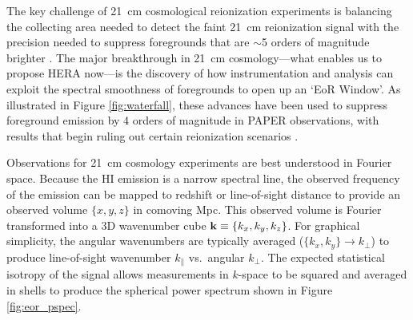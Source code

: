 \documentclass[preprint]{aastex}
\def\kperp{k_{\bot}}
\def\kpar{k_{\|}}
\def\kperp{k_{\bot}}
\def\kpar{k_{\|}}
\def\k{{\bf k}}
\def\HI{{H{\small I }}}
\begin{document}
The key challenge of 21~cm cosmological reionization experiments is 
balancing the collecting area needed to detect the faint 21~cm reionization signal
with the precision needed to suppress
foregrounds that are $\sim$5 orders of magnitude brighter \cite{deolivieracosta_et_al2008}.
The major breakthrough in 21~cm cosmology---what enables us to propose HERA now---is 
the discovery of how 
instrumentation and analysis can exploit the 
spectral smoothness of foregrounds
to open up an `EoR Window'.  
As illustrated in Figure \ref{fig:waterfall}, these advances have been used to suppress foreground emission by 4
orders of magnitude in PAPER observations,
with results that begin ruling out certain reionization scenarios
\citep{parsons_et_al2013}.

Observations for 21~cm cosmology experiments are best understood in
Fourier space.  Because the \HI emission is a
narrow spectral line, the observed frequency of the emission can be mapped to
redshift or line-of-sight distance to provide an observed volume $\{x,y,z\}$ in
comoving Mpc. This observed volume is Fourier transformed into a 3D
wavenumber cube $\k\equiv\{k_{x}, k_{y}, k_{z}\}$. For graphical simplicity, the angular
wavenumbers are typically averaged ($\{k_{x},k_{y}\}\rightarrow\kperp$) to
produce line-of-sight wavenumber $\kpar$ vs.\ angular $\kperp$. 
The expected statistical isotropy of the signal allows measurements in $k$-space to be
squared and averaged in shells to produce the spherical power spectrum
shown in Figure \ref{fig:eor_pspec}.
\end{document}
